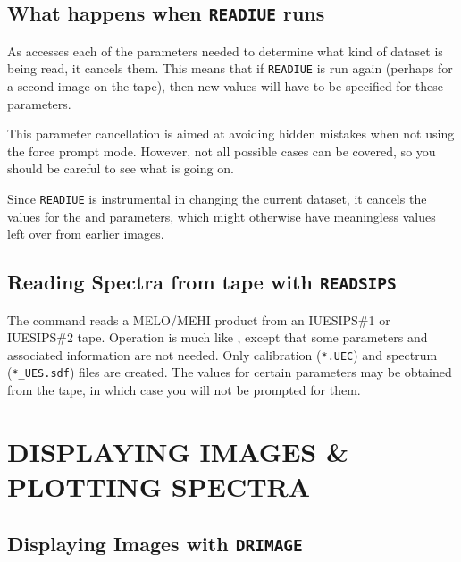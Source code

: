 \subsection{What happens when {\tt READIUE} runs}

As 
 accesses each of the parameters needed to determine what
kind of dataset is being read, it cancels them.  This means that if
\verb+READIUE+ is run again (perhaps for a second image on the tape), then new
values will have to be specified for these parameters.

This parameter cancellation is aimed at avoiding hidden mistakes when not
using the force prompt mode.  However, not all possible cases can be covered,
so you should be careful to see what is going on.

Since \verb+READIUE+ is instrumental in changing the current dataset, it cancels
the values for the 
 and 
 parameters, which might
otherwise have meaningless values left over from earlier images.


\subsection{\label{se:readsips}Reading Spectra from tape
            with {\tt READSIPS}}

The 
 command reads a MELO/MEHI product from an IUESIPS\#1 or
IUESIPS\#2 tape.  Operation is much like ,
except that some
parameters and associated information are not needed.  Only calibration
(\verb+*.UEC+) and spectrum (\verb+*_UES.sdf+) files are created.  The values
for certain parameters may be obtained from the tape, in which case you
will not be prompted for them.


\section{\label{se:disp}DISPLAYING IMAGES \& PLOTTING SPECTRA}


\subsection{\label{subse:drimage}Displaying Images with
            {\tt DRIMAGE}}

